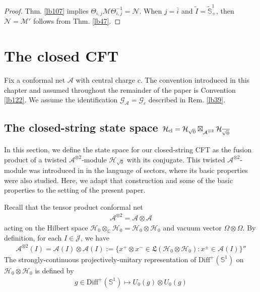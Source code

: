 \documentclass[11pt,b5paper,notitlepage]{article}
\theoremstyle{definition}
\theoremstyle{plain}
\newcommand{\fk}{\mathfrak}
\newcommand{\wtd}{\widetilde}
\newcommand{\ovl}{\overline}
\newcommand{\DiffS}{\mathrm{Diff}^+(\mathbb S^1)}
\newcommand{\GA}{\mathscr G_{\mathcal A}}
\newcommand{\Cbb}{\mathbb C}
\newcommand{\Gc}{\mathscr G_c}
\newcommand{\MA}{\mathcal A}
\newcommand{\MH}{\mathcal H}
\newcommand{\MJ}{\mathcal J}
\newcommand{\MM}{\mathcal M}
\newcommand{\MN}{\mathcal N}
\newcommand{\Maa}{{\mathcal A^{\otimes 2}}}
\newcommand{\sqz}{{\sqrt 0}}
\newcommand{\sbsc}[1]{_{\raisebox{-0.6ex}{$\scriptstyle {#1}$}}}
\newcommand{\MHcl}{\mathcal H_{\mathrm{cl}}}
\newcommand{\Std}{\widetilde {\mathbb S}^1}
\numberwithin{equation}{section}
\begin{document}
\begin{proof}
Thm. \ref{lb107} implies $\Theta_{i,j}\MM\Theta_{i,j}^{-1}=\MN$. When $j=\ovl i$ and $\wtd I=\Std_+$, then $\MN=\MM'$ follows from Thm. \ref{lb47}.
\end{proof}






\section{The closed CFT}

Fix a conformal net $\MA$ with central charge $c$. The convention introduced in this chapter and assumed throughout the remainder of the paper is Convention \ref{lb122}. We assume the identification $\GA=\Gc$ described in Rem. \ref{lb39}.



\subsection{The closed-string state space $\MHcl=\MH_{\sqz}\boxtimes\sbsc{\Maa}\MH_{\ovl\sqz}$}


In this section, we define the state space for our closed-string CFT as the fusion product of a twisted $\Maa$-module $\MH_\sqz$ with its conjugate. This twisted $\Maa$-module was introduced in \cite{LX04} in the language of sectors, where its basic properties were also studied. Here, we adapt that construction and some of the basic properties to the setting of the present paper.



Recall that the tensor product conformal net
\begin{align*}
\Maa=\MA\otimes\MA
\end{align*}
acting on the Hilbert space $\MH_0\otimes_\Cbb\MH_0=\MH_0\otimes\MH_0$ and vacuum vector $\Omega\otimes\Omega$. By definition, for each $I\in\MJ$, we have
\begin{align*}
\Maa(I)=\MA(I)\otimes\MA(I):=\{x^+\otimes x^-\in\fk L(\MH_0\otimes\MH_0):x^\pm\in\MA(I)\}''
\end{align*}
The strongly-continuous projectively-unitary representation of $\DiffS$ on $\MH_0\otimes\MH_0$ is defined by 
\begin{align*}
g\in\DiffS\mapsto U_0(g)\otimes U_0(g)
\end{align*}
\end{document}
